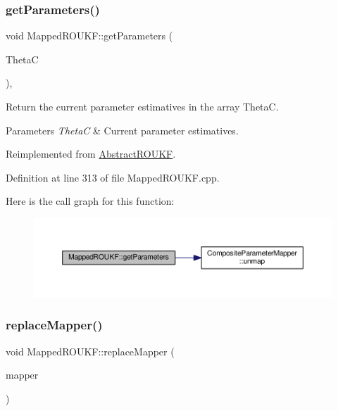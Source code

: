 \subsubsection{\texorpdfstring{get\+Parameters()}{getParameters()}}
{\footnotesize\ttfamily void Mapped\+R\+O\+U\+K\+F\+::get\+Parameters (\begin{DoxyParamCaption}\item[{double $\ast$$\ast$}]{ThetaC }\end{DoxyParamCaption})\hspace{0.3cm}{\ttfamily [override]}, {\ttfamily [virtual]}}

Return the current parameter estimatives in the array {\ttfamily ThetaC}. 
\begin{DoxyParams}{Parameters}
{\em ThetaC} & Current parameter estimatives. \\
\hline
\end{DoxyParams}


Reimplemented from \mbox{\hyperlink{classAbstractROUKF_a1fa0b3e17f2618789dca9319bd755830}{Abstract\+R\+O\+U\+KF}}.



Definition at line 313 of file Mapped\+R\+O\+U\+K\+F.\+cpp.

Here is the call graph for this function\+:\nopagebreak
\begin{figure}[H]
\begin{center}
\leavevmode
\includegraphics[width=350pt]{classMappedROUKF_aa6670e2cc9899b93b71db3f238ae93f3_cgraph}
\end{center}
\end{figure}
\mbox{\label{classMappedROUKF_ad84ef097844217e5c5342e2ee8968521}} 
\subsubsection{\texorpdfstring{replace\+Mapper()}{replaceMapper()}}
{\footnotesize\ttfamily void Mapped\+R\+O\+U\+K\+F\+::replace\+Mapper (\begin{DoxyParamCaption}\item[{\mbox{\hyperlink{classCompositeParameterMapper}{Composite\+Parameter\+Mapper}} $\ast$}]{mapper }\end{DoxyParamCaption})}

